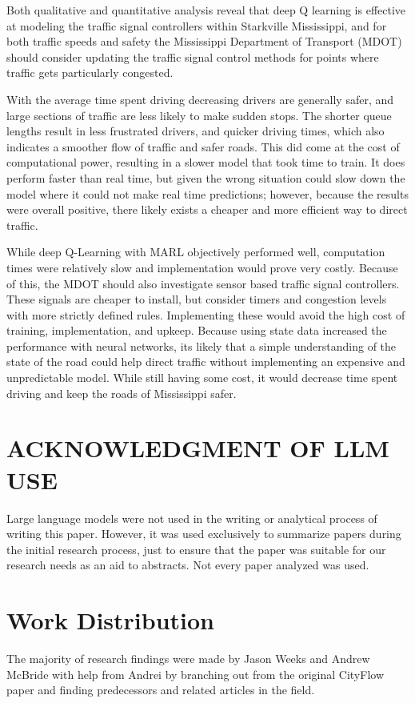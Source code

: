 \documentclass[conference]{IEEEtran}
\begin{document}
Both qualitative and quantitative analysis reveal that deep Q learning is effective at modeling the traffic signal controllers within Starkville Mississippi, and for both traffic speeds and safety the Mississippi Department of Transport (MDOT) should consider updating the traffic signal control methods for points where traffic gets particularly congested. 

With the average time spent driving decreasing drivers are generally safer, and large sections of traffic are less likely to make sudden stops. The shorter queue lengths result in less frustrated drivers, and quicker driving times, which also indicates a smoother flow of traffic and safer roads. This did come at the cost of computational power, resulting in a slower model that took time to train. It does perform faster than real time, but given the wrong situation could slow down the model where it could not make real time predictions; however, because the results were overall positive, there likely exists a cheaper and more efficient way to direct traffic. 

While deep Q-Learning with MARL objectively performed well, computation times were relatively slow and implementation would prove very costly. Because of this, the MDOT should also investigate sensor based traffic signal controllers. These signals are cheaper to install, but consider timers and congestion levels with more strictly defined rules. Implementing these would avoid the high cost of training, implementation, and upkeep. Because using state data increased the performance with neural networks, its likely that a simple understanding of the state of the road could help direct traffic without implementing an expensive and unpredictable model. While still having some cost, it would decrease time spent driving and keep the roads of Mississippi safer. 

\section{ACKNOWLEDGMENT OF LLM USE}

Large language models were not used in the writing or analytical process of writing this paper. However, it was used exclusively to summarize papers during the initial research process, just to ensure that the paper was suitable for our research needs as an aid to abstracts. Not every paper analyzed was used. 

\section*{Work Distribution}
The majority of research findings were made by Jason Weeks and Andrew McBride with help from Andrei by branching out from the original CityFlow paper \cite{7} and finding predecessors and related articles in the field. 
\end{document}
